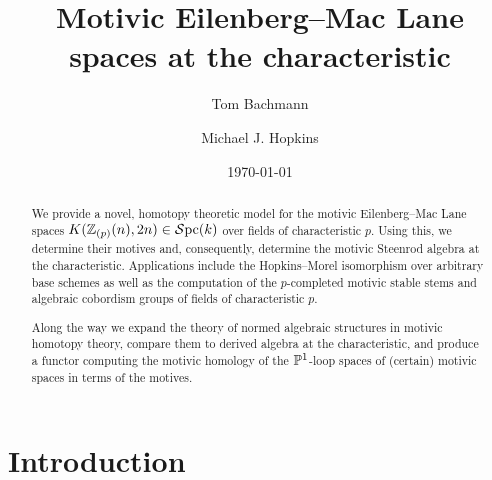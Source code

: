 \documentclass{amsart}
\title{Motivic Eilenberg--Mac Lane spaces at the characteristic}
\date{\today}
\author{Tom Bachmann}
\author{Michael J. Hopkins}
\numberwithin{proposition}{section}
\numberwithin{equation}{section}
\begin{document}
\maketitle

\begin{abstract}
We provide a novel, homotopy theoretic model for the motivic Eilenberg--Mac Lane spaces $K(\Z_{(p)}(n), 2n) \in \Spc(k)$ over fields of characteristic $p$.
Using this, we determine their motives and, consequently, determine the motivic Steenrod algebra at the characteristic.
Applications include the Hopkins--Morel isomorphism over arbitrary base schemes as well as the computation of the $p$-completed motivic stable stems and algebraic cobordism groups of fields of characteristic $p$.

Along the way we expand the theory of normed algebraic structures in motivic homotopy theory, compare them to derived algebra at the characteristic, and produce a functor computing the motivic homology of the $\P^1$-loop spaces of (certain) motivic spaces in terms of the motives.
\end{abstract}

\tableofcontents

\section{Introduction}
\end{document}
